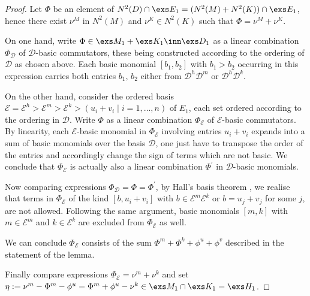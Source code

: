 \begin{proof}
Let $\Phi$ be an element of $N^{2}(D)\cap\exs E_{1}=(N^{2}(M)+N^{2}(K))\cap\exs E_{1}$, hence there exist $\nu^{M}$ in
$N^{2}(M)$ and $\nu^{K}\in N^{2}(K)$ such that $\Phi=\nu^{M}+\nu^{K}$.

On one hand, write $\Phi\in\exs M_{1}+\exs K_{1}\inn\exs D_{1}$ as a linear combination $\Phi_{\mathcal{D}}$ of $\mathcal{D}$-basic commutators, these being constructed according to the ordering of $\mathcal{D}$ as chosen above. Each basic monomial $[b_{1},b_{2}]$ with $b_{1}>b_{2}$ occurring in this expression carries both
entries $b_{1},\,b_{2}$ either from $\mathcal{D}^{h}\mathcal{D}^{m}$ or $\mathcal{D}^{h}\mathcal{D}^{k}$.

On the other hand, consider the ordered basis $\mathcal{E}=\mathcal{E}^{h}>\mathcal{E}^{m}>\mathcal{E}^{k}>
(u_{i}+v_{i}\mid i=1,\dots,n)$  of $E_{1}$, each set ordered according to the ordering in $\mathcal{D}$. Write $\Phi$ as a linear combination $\Phi_{\mathcal{E}}$ of $\mathcal{E}$-basic commutators.
By linearity, each $\mathcal{E}$-basic monomial in $\Phi_{\mathcal{E}}$ involving entries $u_{i}+v_{i}$ expands into a sum of 
basic monomials over the basis $\mathcal{D}$,
one just have to transpose the order of the entries and accordingly change the sign of terms which
are not basic. 
We conclude that $\Phi_{\mathcal{E}}$ is actually also a linear combination $\Phi^{\prime}$ in $\mathcal{D}$-basic monomials.

Now comparing expressions $\Phi_{\mathcal{D}}=\Phi=\Phi^{\prime}$, by Hall's basis theorem
\pref{}, we realise that terms in $\Phi_{\mathcal{E}}$ of the kind
$[b,u_{i}+v_{i}]$ with $b\in\mathcal{E}^{m}\mathcal{E}^{k}$ or $b=u_{j}+v_{j}$ for some $j$, are not allowed. Following the same
argument, basic monomials $[m,k]$ with $m\in\mathcal{E}^{m}$ and $k\in\mathcal{E}^{k}$ are excluded from $\Phi_{\mathcal{E}}$
as well.

We can conclude $\Phi_{\mathcal{E}}$ consists of the sum $\Phi^{m}+\Phi^{k}+\phi^{u}+\phi^{v}$ described in the statement of the lemma.

Finally compare expressions $\Phi_{\mathcal{E}}=\nu^{m}+\nu^{k}$ and set
$\eta:=\nu^{m}-  \Phi^{m} -\phi^{u}=\Phi^{m} +\phi^{u}-\nu^{k}     \in\exs M_{1}\cap\exs K_{1}=\exs H_{1}$.
\end{proof}

